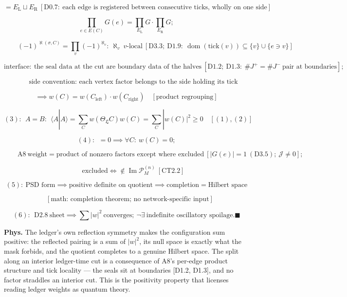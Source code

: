 \begin{theorem}
\[
= E_{\mathrm L}\sqcup E_{\mathrm R}\ [\mathrm{D0.7}:\ \text{each edge is registered between consecutive ticks, wholly on one side}]
\]

\[
\prod_{e\in E(C)}G(e)=\prod_{E_{\mathrm L}}G\cdot\prod_{E_{\mathrm R}}G;
\]

\[
\qquad (-1)^{\aleph(\sigma,C)}=\prod_v(-1)^{\aleph_v}:\ \aleph_v\ v\text{-local}\ [\mathrm{D3.3};\ \mathrm{D1.9}:\ \operatorname{dom}(\mathrm{tick}(v))\subseteq\{v\}\cup\{e\ni v\}]
\]

\[
\text{interface}:\ \text{the seal data at the cut are boundary data of the halves}\ [\mathrm{D1.2};\ \mathrm{D1.3}:\ \#J^+=\#J^-\ \text{pair at boundaries}];
\]

\[
\qquad \text{side convention: each vertex factor belongs to the side holding its tick}
\]

\[
\implies w(C)=w(C_{\mathrm{left}})\cdot w(C_{\mathrm{right}})\quad[\text{product regrouping}]
\]

\[
(3):\ \ A=B:\ \ \langle A|A\rangle=\sum_Cw(\Theta_{\mathfrak L}C)w(C)=\sum_C|w(C)|^2\ge0\quad[(1),(2)]
\]

\[
(4):\ \ =0\implies\forall C:\ w(C)=0;
\]

\[
\qquad \mathrm{A8}\ \text{weight}=\text{product of nonzero factors except where excluded}\ [|G(e)|=1\ \mathrm{(D3.5)};\ \mathcal J\ne0];
\]

\[
\qquad \text{excluded}\iff\notin\operatorname{Im}\mathcal P_M^{(n)}\ [\mathrm{CT2.2}]
\]

\[
(5):\ \text{PSD form}\implies\text{positive definite on quotient}\implies\text{completion}=\text{Hilbert space}
\]

\[
\quad [\text{math: completion theorem; no network-specific input}]
\]

\[
(6):\ \ \mathrm{D2.8}\ \text{sheet}\implies\sum|w|^2\ \text{converges};\ \neg\exists\ \text{indefinite oscillatory spoilage}. \blacksquare
\]

\textbf{Phys.} The ledger’s own reflection symmetry makes the configuration sum positive: the reflected pairing is a sum of $|w|^2$, its null space is exactly what the mask forbids, and the quotient completes to a genuine Hilbert space. The split along an interior ledger-time cut is a consequence of A8’s per-edge product structure and tick locality — the seals sit at boundaries [D1.2, D1.3], and no factor straddles an interior cut. This is the positivity property that licenses reading ledger weights as quantum theory.

\end{theorem}

